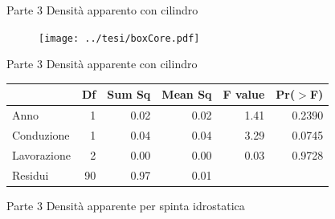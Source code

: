 \documentclass[10pt]{beamer}
\begin{document}
\begin{frame}
\end{frame}


\begin{frame}[label=Core]{Parte 3 \small{Densità apparento con \alert{cilindro}}}
  \hyperlink{finale}{}  
  \begin{figure}
    \texttt{[image: ../tesi/boxCore.pdf]}
  \end{figure}
\end{frame}

\begin{frame}{Parte 3 \small{Densità apparente con \alert{cilindro}} }
  \begin{table}[ht]
    \centering
    \label{tab:anova del modello}
    \begin{tabular}{lrrrrr}
      \hline
      & Df & Sum Sq & Mean Sq & F value & Pr($>$F) \\ 
      \hline 
      Anno         & 1  &  0.02  &  0.02  &   1.41   & 0.2390   \\ 
      Conduzione   & 1  &  0.04  &  0.04  &   3.29   & 0.0745   \\ 
      Lavorazione  & 2  &  0.00  &  0.00  &   0.03   & 0.9728   \\ 
      Residui      & 90 &  0.97  &  0.01  &          &          \\ 
      \hline
    \end{tabular}
  \end{table}
\end{frame}

\begin{frame}[label=Clod]{Parte 3 \small{Densità apparente per \alert{spinta
        idrostatica}}} 
  \hyperlink{finale}{}
\end{frame}
\end{document}
